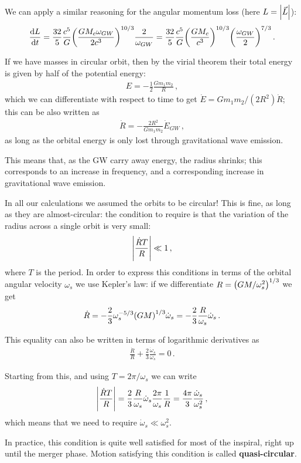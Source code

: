 \documentclass[main.tex]{subfiles}
\begin{document}
We can apply a similar reasoning for the angular momentum loss (here \(L = \abs{\vec{L}}\)): 
%
\begin{align}
\dv{L}{t} = 
\frac{32}{5} \frac{c^{5}}{G} \qty( \frac{G M_c \omega_{GW}}{2 c^{3}})^{10/3} \frac{2}{\omega_{GW}}
= \frac{32}{5} \frac{c^{5}}{G} \qty(\frac{G M_c}{c^{3}})^{10/3} \qty(\frac{\omega_{GW}}{2})^{7/3}
\,.
\end{align}

If we have masses in circular orbit, then by the virial theorem their total energy is given by half of the potential energy: 
%
\begin{align}
E = - \frac{1}{2} \frac{G m_1 m_2  }{R}
\,,
\end{align}
%
which we can differentiate with respect to time to get \(\dot{E} = G m_1 m_2 / (2 R^2) \dot{R}\); this can be also written as
%
\begin{align} \label{eq:radius-evolution-binary}
\dot{R} = - \frac{2R^2}{G m_1 m_2 } \dot{E}_{GW}
\,,
\end{align}
%
as long as the orbital energy is only lost through gravitational wave emission. 

This means that, as the GW carry away energy, the radius shrinks; this corresponds to an increase in frequency, and a corresponding increase in gravitational wave emission. 

In all our calculations we assumed the orbits to be circular!
This is fine, as long as they are almost-circular: the condition to require is that the variation of the radius across a single orbit is very small: 
%
\begin{align}
\abs{\frac{\dot{R} T}{R}} \ll 1
\,,
\end{align}
%
where \(T\) is the period.
In order to express this conditions in terms of the orbital angular velocity \(\omega_{s}\) we use Kepler's law: if we differentiate \(R = \qty(GM / \omega_{s}^2)^{1/3}\) we get 
%
\begin{align} \label{eq:derivative-radius-evolution-binary}
\dot{R} = - \frac{2}{3} \omega_{s}^{-5/3} \qty(GM)^{1/3} \dot{\omega}_{s}
= - \frac{2}{3} \frac{R}{\omega_{s}} \dot{\omega}_{s}
\,.
\end{align}

This equality can also be written in terms of logarithmic derivatives as 
%
\begin{align} \label{eq:log-derivatives-radius-angular-velocity-binary}
\frac{\dot{R}}{R} + \frac{2}{3} \frac{\dot{\omega}_{s}}{\omega_{s}} = 0
\,.
\end{align}

Starting from this, and using \(T = 2 \pi / \omega_{s}\) we can write 
%
\begin{align}
\abs{\frac{\dot{R}T}{R}} = \frac{2}{3} \frac{R}{\omega_{s}} \dot{\omega}_{s} \frac{2\pi}{\omega_{s}} \frac{1}{R} = \frac{4 \pi }{3} \frac{\dot{\omega}_{s}}{\omega_{s}^2} 
\,,
\end{align}
% 
which means that we need to require \(\dot{\omega}_{s} \ll \omega_{s}^2\).

In practice, this condition is quite well satisfied for most of the inspiral, right up until the merger phase. 
Motion satisfying this condition is called \textbf{quasi-circular}. 
\end{document}
